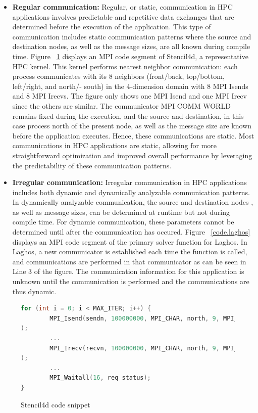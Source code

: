 \begin{itemize}
\item \textbf{Regular communication:} Regular, or static, communication in HPC applications involves predictable and repetitive data exchanges that are determined before the execution of the application. This type of communication includes static communication patterns where the source and destination nodes, as well as the message sizes, are all known during compile time. Figure ~\ref{code.stencil} displays an MPI code segment of Stencil4d, a representative HPC kernel.
This kernel performs nearest neighbor communication: each process communicates with its 8 neighbors (front/back, top/bottom, left/right, and north/- south) in the 4-dimension domain with 8 MPI Isends and 8 MPI Irecvs. The figure only shows one MPI Isend and one MPI Irecv since the others are similar. The communicator MPI COMM WORLD remains fixed during the execution, and the source and destination, in this case process north of the present node, as well as the message size are known before the application executes. Hence, these communications are static. 
Most communications in HPC applications are static, allowing for more straightforward optimization and improved overall performance by leveraging the predictability of these communication patterns.

\item \textbf{Irregular communication:} Irregular communication in HPC applications includes both dynamic and 
dynamically analyzable communication patterns. 
In dynamically analyzable communication, the source and destination nodes
, as well as message sizes, can be determined at runtime but not 
during compile time. For dynamic communication, these parameters cannot be determined 
until after the communication has occured. Figure ~\ref{code.laghos} displays an MPI code segment of the primary solver function for Laghos. In Laghos, a new communicator is established each time the function is called, and communications are performed in that communicator as can be seen in Line 3 of the figure. The communication information for this application is unknown until the communication is performed and the communications are thus dynamic.

\end{itemize}

\begin{figure}[H]
\begin{lstlisting}[breaklines, language=C++, frame=single, tabsize=4, basicstyle=\ttfamily]
for (int i = 0; i < MAX_ITER; i++) {
        MPI_Isend(sendn, 100000000, MPI_CHAR, north, 9, MPI_COMM_WORLD, &reqs[0]
);
        ...
        MPI_Irecv(recvn, 100000000, MPI_CHAR, north, 9, MPI_COMM_WORLD, &reqs[8]
);
        ...
        MPI_Waitall(16, req status);
}
\end{lstlisting}
\caption{Stencil4d code snippet}
\label{code.stencil}
\end{figure}


